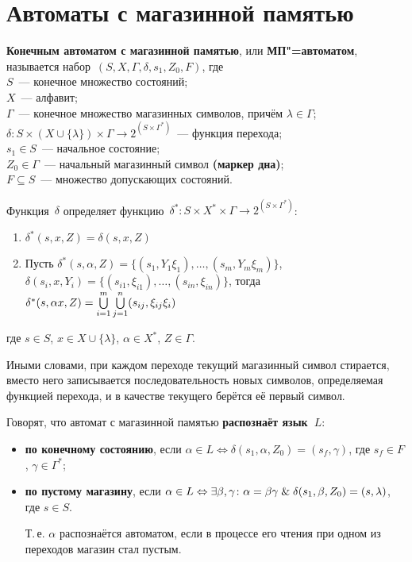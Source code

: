 \section{Автоматы с магазинной памятью}
  \textbf{Конечным автоматом с магазинной памятью}, или \textbf{МП"=автоматом}, называется набор~$(S, X, \Gamma, \delta, s_1, Z_0, F)$, где\\
$S$~--- конечное множество состояний;\\
$X$~--- алфавит;\\
$\Gamma$~--- конечное множество магазинных символов, причём $\lambda \in \Gamma$;\\
$\delta \colon S \times (X \cup \{ \lambda \}) \times \Gamma \to 2^{(S \times \Gamma^*)}$~--- функция перехода;\\
$s_1 \in S$~--- начальное состояние;\\
$Z_0 \in \Gamma$~--- начальный магазинный символ \textbf{(маркер дна)};\\
$F \subseteq S$~--- множество допускающих состояний.

Функция~$\delta$ определяет функцию~$\delta^* \colon S \times X^* \times \Gamma \to 2^{(S \times \Gamma^*)}$:
\begin{enumerate}
	\item $\delta^*(s, x, Z) = \delta(s, x, Z)$
	\item Пусть $\delta^*(s, \alpha, Z) = \{ (s_1, Y_1 \xi_1), \ldots, (s_m, Y_m \xi_m) \}$,
	$\delta(s_i, x, Y_i) = \{ (s_{i1}, \xi_{i1}), \ldots, (s_{in}, \xi_{in}) \}$,
	тогда
	$\delta^*(s, \alpha x, Z) \opbr= \bigcup\limits_{i=1}^m \bigcup\limits_{j=1}^n (s_{ij}, \xi_{ij} \xi_i)$
\end{enumerate}
где $s \in S$, $x \in X \cup \{ \lambda \}$, $\alpha \in X^*$, $Z \in \Gamma$.

Иными словами, при каждом переходе текущий магазинный символ стирается, вместо него записывается последовательность новых символов, определяемая функцией перехода, и в качестве текущего берётся её первый символ.

Говорят, что автомат с магазинной памятью \textbf{распознаёт язык~$L$}:
\begin{itemize}
	\item \textbf{по конечному состоянию}, если $\alpha \in L \Leftrightarrow \delta(s_1, \alpha, Z_0) = (s_f, \gamma)$, где $s_f \in F$, $\gamma \in \Gamma^*$;
	\item \textbf{по пустому магазину}, если $\alpha \in L \Leftrightarrow \exists \beta, \gamma \colon \alpha = \beta \gamma \mathrel{\&} \delta(s_1, \beta, Z_0) = (s, \lambda)$, где $s \in S$.
	
	Т.\,е. $\alpha$ распознаётся автоматом, если в процессе его чтения при одном из переходов магазин стал пустым.
\end{itemize}

